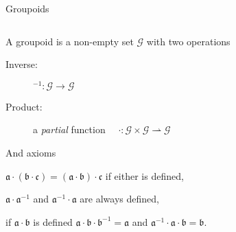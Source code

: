 \documentclass[aspectratio=169]{beamer}
\renewcommand{\a}{\mathfrak{a}}
\renewcommand{\b}{\mathfrak{b}}
\renewcommand{\c}{\mathfrak{c}}
\newcommand{\G}{\mathcal{G}}
\begin{document}

\begin{frame}{Groupoids}
  \large

  \begin{columns}
    \begin{column}{0.7\textwidth}
      A groupoid is a non-empty set $\G$ with two operations
      \begin{description}
      \item[Inverse:] $^{-1} : \G \to \G$
      \item[Product:] a \emph{partial} function $\quad\cdot : \G × \G \rightharpoonup \G$
      \end{description}

      \bigskip
      And axioms
      \begin{description}[labelwidth=0]
      \item[Associativity:] \emph{$\a \cdot (\b \cdot \c) = (\a \cdot \b) \cdot \c$} if either is defined,
      \item[Inverse:] \emph{$\a \cdot \a^{-1}$} and \emph{$\a^{-1} \cdot \a$} are always defined,
      \item[Identity:] if $\a\cdot \b$ is defined \emph{$\a \cdot \b \cdot \b^{-1} = \a$} and
        \emph{$\a^{-1} \cdot \a \cdot \b = \b$}.
      \end{description}
    \end{column}
    \begin{column}{0.3\textwidth}
      \centering
    \end{column}
  \end{columns}
\end{frame}

\end{document}
